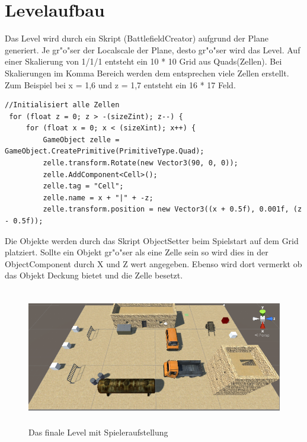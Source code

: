 \chapter{Levelaufbau}
Das Level wird durch ein Skript (BattlefieldCreator) aufgrund der Plane generiert. Je gr"o"ser der Localscale der Plane, desto gr"o"ser wird
das Level. Auf einer Skalierung von 1/1/1 entsteht ein 10 * 10 Grid aus Quads(Zellen). Bei Skalierungen im Komma Bereich werden dem entsprechen viele Zellen erstellt. Zum Beispiel bei x = 1,6 und z = 1,7 entsteht ein 16 * 17 Feld.

\begin{lstlisting}[breaklines = true]
 //Initialisiert alle Zellen
 for (float z = 0; z > -(sizeZint); z--) {
	 for (float x = 0; x < (sizeXint); x++) {
		 GameObject zelle = GameObject.CreatePrimitive(PrimitiveType.Quad);
		 zelle.transform.Rotate(new Vector3(90, 0, 0));
		 zelle.AddComponent<Cell>();
		 zelle.tag = "Cell";
		 zelle.name = x + "|" + -z;
		 zelle.transform.position = new Vector3((x + 0.5f), 0.001f, (z - 0.5f));
\end{lstlisting}

Die Objekte werden durch das Skript ObjectSetter beim Spielstart auf dem Grid platziert. Sollte ein Objekt gr"o"ser als eine Zelle sein so wird dies in der ObjectComponent durch X und Z wert angegeben. Ebenso wird dort vermerkt ob das Objekt Deckung bietet und die Zelle besetzt.


\begin{figure}
	\centering
	\includegraphics[height=6cm]{images/FinalLevel.png}
	\caption{Das finale Level mit Spieleraufstellung}
	\label{fig:FinalLevel}
\end{figure}
